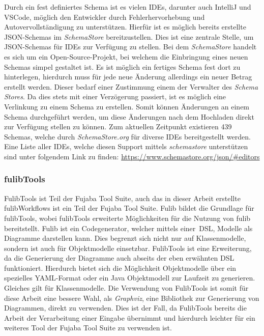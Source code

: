 Durch ein fest definiertes Schema ist es vielen IDEs, darunter auch IntelliJ und VSCode,
möglich den Entwickler durch Fehlerhervorhebung und Autovervollständigung zu unterstützen.
Hierfür ist es möglich bereits erstellte JSON-Schemas im \textit{SchemaStore} bereitzustellen.
Dies ist eine zentrale Stelle, um JSON-Schemas für IDEs zur Verfügung zu stellen.
Bei dem \textit{SchemaStore} handelt es sich um ein Open-Source-Projekt, bei welchem die Einbringung eines neuen Schemas simpel gestaltet ist.
Es ist möglich ein fertiges Schema fest dort zu hinterlegen, hierdurch muss für jede neue Änderung allerdings ein neuer Betrag erstellt werden.
Dieser bedarf einer Zustimmung einem der Verwalter des \textit{Schema Stores}.
Da dies stets mit einer Verzögerung passiert, ist es möglich eine Verlinkung zu einem Schema zu erstellen.
Somit können Änderungen an einem Schema durchgeführt werden, um diese Änderungen nach dem Hochladen direkt zur Verfügung stellen zu können.
Zum aktuellen Zeitpunkt existieren 439 Schemas, welche durch \textit{SchemaStore.org} für diverse IDEs bereitgestellt werden.\cite*{schemaStore}
Eine Liste aller IDEs, welche diesen Support mittels \textit{schemastore} unterstützen sind unter folgendem
Link zu finden: \url{https://www.schemastore.org/json/#editors}

\subsubsection{fulibTools}
FulibTools ist Teil der Fujaba Tool Suite, auch das in dieser Arbeit erstellte fulibWorkflows ist ein Teil der Fujaba Tool Suite.
Fulib bildet die Grundlage für fulibTools, wobei fulibTools erweiterte Möglichkeiten für die Nutzung von fulib bereitstellt.
Fulib ist ein Codegenerator, welcher mittels einer~\ac{DSL}, Modelle als Diagramme darstellen kann.\cite*{fulib}
Dies begrenzt sich nicht nur auf Klassenmodelle, sondern ist auch für Objektmodelle einsetzbar.
FulibTools ist eine Erweiterung, da die Generierung der Diagramme auch abseits der eben erwähnten DSL funktioniert.\cite*{fulibTools}
Hierdurch bietet sich die Möglichkeit Objektmodelle über ein spezielles YAML-Format oder ein Java Objektmodell zur Laufzeit zu generieren.
Gleiches gilt für Klassenmodelle.
Die Verwendung von FulibTools ist somit für diese Arbeit eine bessere Wahl, als \textit{Graphviz}, eine Bibliothek zur Generierung von Diagrammen, direkt zu verwenden.
Dies ist der Fall, da FulibTools bereits die Arbeit der Verarbeitung einer Eingabe übernimmt und hierdurch leichter für ein weiteres Tool der Fujaba Tool Suite zu verwenden ist.
